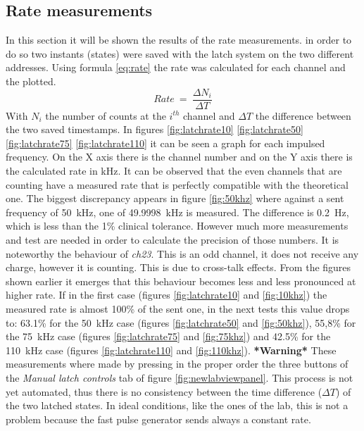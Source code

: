 \subsection{Rate measurements}\label{RateMeasurements}
\noindent In this section it will be shown the results of the rate measurements. in order to do so two instants (states) were saved with the latch system on the two different addresses. Using formula \ref{eq:rate} the rate was calculated for each channel and the plotted.
\begin{equation}\label{eq:rate}
	Rate\:=\: \frac{\Delta N_i}{\Delta T}
\end{equation}
\noindent With $N_i$ the number of counts at the $i^{th}$ channel and $\Delta T$ the difference between the two saved timestamps.
In figures \ref{fig:latchrate10} \ref{fig:latchrate50} \ref{fig:latchrate75} \ref{fig:latchrate110} it can be seen a graph for each impulsed frequency. On the X axis there is the channel number and on the Y axis there is the calculated rate in kHz. It can be observed that the even channels that are counting have a measured rate that is perfectly compatible with the theoretical one.
The biggest discrepancy appears in figure \ref{fig:50khz} where against a sent frequency of 50~kHz, one of 49.9998~kHz is measured. The difference is 0.2~Hz, which is less than the 1\% clinical tolerance. However much more measurements and test are needed in order to calculate the precision of those numbers.
It is noteworthy the behaviour of \textit{ch23}. This is an odd channel, it does not receive any charge, however it is counting. This is due to cross-talk effects.
From the figures shown earlier it emerges that this behaviour becomes less and less pronounced at higher rate.
If in the first case (figures \ref{fig:latchrate10} and \ref{fig:10khz}) the measured rate is almost 100\% of the sent one, in the next tests this value drops to:
63.1\% for the 50~kHz case (figures \ref{fig:latchrate50} and \ref{fig:50khz}),
55,8\% for the 75~kHz case (figures \ref{fig:latchrate75} and \ref{fig:75khz}) and
42.5\% for the 110~kHz case (figures \ref{fig:latchrate110} and \ref{fig:110khz}).
\newline
\noindent \textbf{*Warning*} These measurements where made by pressing in the proper order the three buttons of the \textit{Manual latch controls} tab of figure \ref{fig:newlabviewpanel}.
This process is not yet automated, thus there is no consistency between the time difference ($\Delta T$) of the two latched states.
In ideal conditions, like the ones of the lab, this is not a problem because the fast pulse generator sends always a constant rate.
